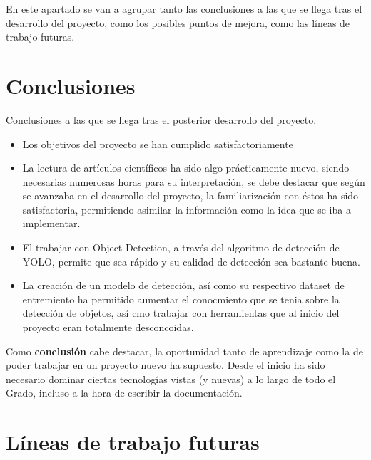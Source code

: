 
En este apartado se van a agrupar tanto las conclusiones a las que se llega tras el desarrollo del proyecto, como los posibles puntos de mejora, como las líneas de trabajo futuras.

\section{Conclusiones}
Conclusiones a las que se llega tras el posterior desarrollo del proyecto.
\begin{itemize}
    \item Los objetivos del proyecto se han cumplido satisfactoriamente
    \item La lectura de artículos científicos ha sido algo prácticamente nuevo, siendo necesarias numerosas horas para su interpretación, se debe destacar que según se avanzaba en el desarrollo del proyecto, la familiarización con éstos ha sido satisfactoria, permitiendo asimilar la información como la idea que se iba a implementar.
    \item El trabajar con Object Detection, a través del algoritmo de detección de YOLO, permite que sea rápido y su calidad de detección sea bastante buena.
    \item La creación de un modelo de detección, así como su respectivo dataset de entremiento ha permitido aumentar el conocmiento que se tenia sobre la detección de objetos, así cmo trabajar con herramientas que al inicio del proyecto eran totalmente desconcoidas. 
\end{itemize}

Como \textbf{conclusión} cabe destacar, la oportunidad tanto de aprendizaje como la de poder trabajar en un proyecto nuevo ha supuesto. Desde el inicio ha sido necesario dominar ciertas tecnologías vistas (y nuevas) a lo largo de todo el Grado, incluso a la hora de escribir la documentación.

\section{Líneas de trabajo futuras}